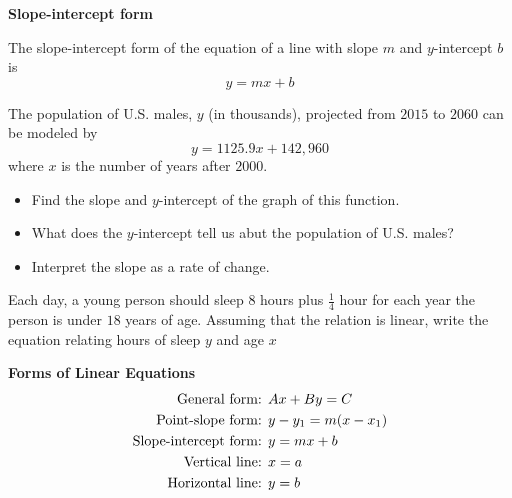 \documentclass[../mathNotesPreamble]{subfiles}
\begin{document}
    \noindent\textbf{Slope-intercept form}
    \begin{defn*}
      The slope-intercept form of the equation of a line with slope $m$ and $y$-intercept $b$ is
        \[y=mx+b\]
    \end{defn*}
    \begin{ex*}[Example 7, p.82]
      The population of U.S. males, $y$ (in thousands), projected from $2015$ to $2060$ can be modeled by
        \[y=1125.9x+142,960\]
      where $x$ is the number of years after $2000$.
      \begin{itemize}
        \item Find the slope and $y$-intercept of the graph of this function.
        \item What does the $y$-intercept tell us abut the population of U.S. males?
        \item Interpret the slope as a rate of change.
      \end{itemize}
    \end{ex*}
    \pagebreak
    
    \begin{ex*}
      Each day, a young person should sleep 8 hours plus $\frac{1}{4}$ hour for each year the person is under $18$ years of age. Assuming that the relation is linear, write the equation relating hours of sleep $y$ and age $x$
    \end{ex*}

    \textbf{Forms of Linear Equations}\\
      \begin{align*}
        \textnormal{General form: }& Ax+By=C\\
        \textnormal{Point-slope form: }& y-y_1=m(x-x_1)\\
        \textnormal{Slope-intercept form: }& y=mx+b\\
        \textnormal{Vertical line: }& x=a\\
        \textnormal{Horizontal line: }& y=b
      \end{align*}

    \pagebreak
\end{document}

